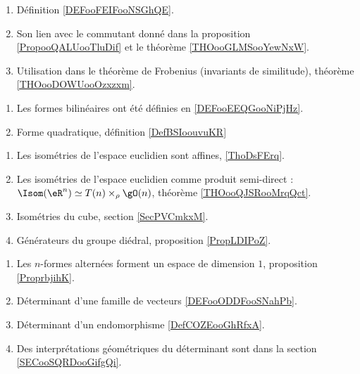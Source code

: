     \begin{enumerate}
        \item
            Définition \ref{DEFooFEIFooNSGhQE}.
        \item
            Son lien avec le commutant donné dans la proposition \ref{PropooQALUooTluDif} et le théorème \ref{THOooGLMSooYewNxW}.
        \item
            Utilisation dans le théorème de Frobenius (invariants de similitude), théorème \ref{THOooDOWUooOzxzxm}.
        \end{enumerate}

    \begin{enumerate}
\item
    Les formes bilinéaires ont été définies en \ref{DEFooEEQGooNiPjHz}.
\item
    Forme quadratique, définition \ref{DefBSIoouvuKR}
\end{enumerate}

\begin{enumerate}
    \item
        Les isométries de l'espace euclidien sont affines, \ref{ThoDsFErq}.
    \item
        Les isométries de l'espace euclidien comme produit semi-direct : $\Isom(\eR^n)\simeq T(n)\times_{\rho}\gO(n)$, théorème \ref{THOooQJSRooMrqQct}.
    \item
        Isométries du cube, section \ref{SecPVCmkxM}.
    \item 
        Générateurs du groupe diédral, proposition \ref{PropLDIPoZ}.
\end{enumerate}

    \begin{enumerate}
    \item
        Les \( n\)-formes alternées forment un espace de dimension \( 1\), proposition \ref{ProprbjihK}.
    \item
        Déterminant d'une famille de vecteurs \ref{DEFooODDFooSNahPb}.
    \item
        Déterminant d'un endomorphisme \ref{DefCOZEooGhRfxA}.
        \item
            Des interprétations géométriques du déterminant sont dans la section \ref{SECooSQRDooGifgQi}.
        \end{enumerate}

